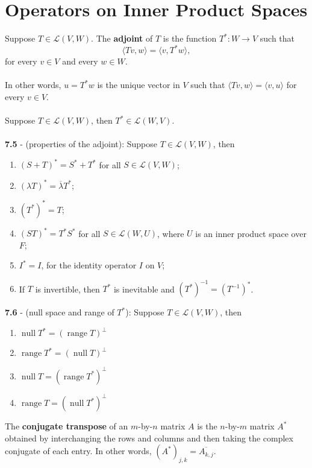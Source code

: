\documentclass{article}
\DeclareMathOperator{\Null}{null}
\DeclareMathOperator{\Range}{range}
\theoremstyle{definition}
\begin{document}
\section*{Operators on Inner Product Spaces}
Suppose $T \in \mathcal{L}(V, W)$. The \textbf{adjoint} of $T$ is the function $T^*: W \rightarrow V$ such that $$\langle Tv, w \rangle = \langle v, T^* w \rangle,$$ for every $v \in V$ and every $w \in W$. \\ \\
In other words, $u = T^* w$ is the unique vector in $V$ such that $\langle Tv, w \rangle = \langle v, u \rangle$ for every $v \in V.$ \\ \\
Suppose $T \in \mathcal{L}(V, W)$, then $T^* \in \mathcal{L}(W, V)$. \\ \\
\textbf{7.5} - (properties of the adjoint): Suppose $T \in \mathcal{L}(V, W)$, then \begin{enumerate}
    \item $(S + T)^* = S^* + T^*$ for all $S \in \mathcal{L}(V, W)$;
    \item $(\lambda T)^* = \overline{\lambda} T^*$;
    \item $(T^*)^* = T$;
    \item $(ST)^* = T^* S^*$ for all $S \in \mathcal{L}(W, U)$, where $U$ is an inner product space over $F$;
    \item $I^* = I$, for the identity operator $I$ on $V$;
    \item If $T$ is invertible, then $T^*$ is inevitable and $(T^*)^{-1} = (T^{-1})^*$.
\end{enumerate} $ $ \\
\textbf{7.6} - (null space and range of $T^*$): Suppose $T \in \mathcal{L}(V, W)$, then \begin{enumerate}
    \item $\Null{T^*} = (\Range{T})^\perp$
    \item $\Range{T^*} = (\Null{T})^\perp$
    \item $\Null{T} = (\Range{T^*})^\perp$
    \item $\Range{T} = (\Null{T^*})^\perp$
\end{enumerate} $ $ \\
The \textbf{conjugate transpose} of an $m$-by-$n$ matrix $A$ is the $n$-by-$m$ matrix $A^*$ obtained by interchanging the rows and columns and then taking the complex conjugate of each entry. In other words, $(A^*)_{j, k} = \overline{A_{k, j}}$. \\ \\
\end{document}

